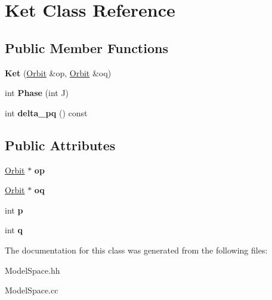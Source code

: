\hypertarget{classKet}{}\section{Ket Class Reference}
\label{classKet}
\subsection*{Public Member Functions}
\begin{DoxyCompactItemize}
\item 
{\bfseries Ket} (\hyperlink{classOrbit}{Orbit} \&op, \hyperlink{classOrbit}{Orbit} \&oq)\hypertarget{classKet_acbf992b0310758f890a6a0ae659c1a46}{}\label{classKet_acbf992b0310758f890a6a0ae659c1a46}

\item 
int {\bfseries Phase} (int J)\hypertarget{classKet_ac07bfbc7c7f2bdf77341ba6d54036e8e}{}\label{classKet_ac07bfbc7c7f2bdf77341ba6d54036e8e}

\item 
int {\bfseries delta\+\_\+pq} () const \hypertarget{classKet_abe51d0067210381fdbadcecd6331c8c7}{}\label{classKet_abe51d0067210381fdbadcecd6331c8c7}

\end{DoxyCompactItemize}
\subsection*{Public Attributes}
\begin{DoxyCompactItemize}
\item 
\hyperlink{classOrbit}{Orbit} $\ast$ {\bfseries op}\hypertarget{classKet_a9210bf82629ea07996f3b895bc54ba4d}{}\label{classKet_a9210bf82629ea07996f3b895bc54ba4d}

\item 
\hyperlink{classOrbit}{Orbit} $\ast$ {\bfseries oq}\hypertarget{classKet_aa509bf4e812f84bb4c81b00a10d9e82f}{}\label{classKet_aa509bf4e812f84bb4c81b00a10d9e82f}

\item 
int {\bfseries p}\hypertarget{classKet_a3120fbd6d28583a0e06d6426e0e69c83}{}\label{classKet_a3120fbd6d28583a0e06d6426e0e69c83}

\item 
int {\bfseries q}\hypertarget{classKet_afd050bca27dacccd2637266804b4d710}{}\label{classKet_afd050bca27dacccd2637266804b4d710}

\end{DoxyCompactItemize}


The documentation for this class was generated from the following files\+:\begin{DoxyCompactItemize}
\item 
Model\+Space.\+hh\item 
Model\+Space.\+cc\end{DoxyCompactItemize}
